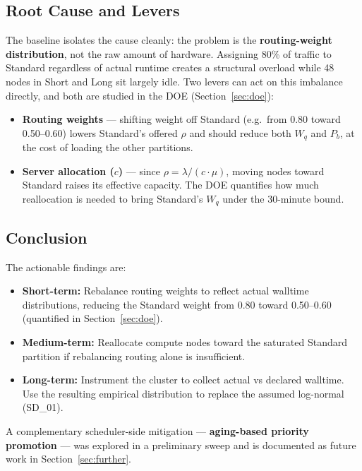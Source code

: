\documentclass[11pt,a4paper]{article}
\newcommand{\Wq}{\ensuremath{W_q}}
\newcommand{\Pb}{\ensuremath{P_b}}
\newcommand{\lam}{\ensuremath{\lambda}}
\newcommand{\murate}{\ensuremath{\mu}}
\begin{document}
\subsection{Root Cause and Levers}

The baseline isolates the cause cleanly: the problem is the \textbf{routing-weight distribution}, not the
raw amount of hardware. Assigning 80\% of traffic to Standard regardless of actual runtime creates a
structural overload while 48 nodes in Short and Long sit largely idle. Two levers can act on this
imbalance directly, and both are studied in the DOE (Section~\ref{sec:doe}):

\begin{itemize}
  \item \textbf{Routing weights} — shifting weight off Standard (e.g.\ from 0.80 toward 0.50--0.60) lowers
  Standard's offered $\rho$ and should reduce both $\Wq$ and $\Pb$, at the cost of loading the other partitions.
  \item \textbf{Server allocation ($c$)} — since $\rho = \lam/(c \cdot \murate)$, moving nodes toward Standard
  raises its effective capacity. The DOE quantifies how much reallocation is needed to bring Standard's
  $\Wq$ under the 30-minute bound.
\end{itemize}

\subsection{Conclusion}

The actionable findings are:
\begin{itemize}
  \item \textbf{Short-term:} Rebalance routing weights to reflect actual walltime distributions, reducing
  the Standard weight from 0.80 toward 0.50--0.60 (quantified in Section~\ref{sec:doe}).
  \item \textbf{Medium-term:} Reallocate compute nodes toward the saturated Standard partition if
  rebalancing routing alone is insufficient.
  \item \textbf{Long-term:} Instrument the cluster to collect actual vs declared walltime. Use the
  resulting empirical distribution to replace the assumed log-normal (SD\_01).
\end{itemize}

A complementary scheduler-side mitigation --- \textbf{aging-based priority promotion} --- was explored in
a preliminary sweep and is documented as future work in Section~\ref{sec:further}.
\end{document}
